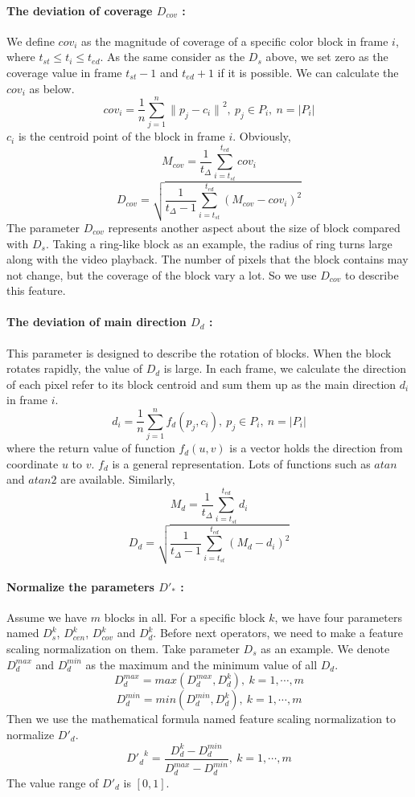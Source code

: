 \documentclass[a4paper, twocolumn]{article}
\begin{document}
			\paragraph{The deviation of coverage $D_{cov}$ :}
			We define $cov_i$ as the magnitude of coverage of a specific color block in frame $i$, where $t_{st} \leqslant t_i \leqslant t_{ed}$. As the same consider as the $D_s$ above, we set zero as the coverage value in frame $t_{st}-1$ and $t_{ed}+1$ if it is possible. We can calculate the $cov_i$ as below.
			$$cov_i = \frac{1}{n}\sum\limits_{j=1}^{n}{\lVert p_j-c_i \lVert}^2, \ p_j \in P_i, \ n=\lvert P_i \lvert$$
			$c_i$ is the centroid point of the block in frame $i$. Obviously,
			$$M_{cov} = \frac{1}{t_{\Delta}}\sum\limits_{i=t_{st}}^{t_{ed}}cov_i$$
			$$D_{cov} = \sqrt{\frac{1}{t_{\Delta}-1}\sum\limits_{i=t_{st}}^{t_{ed}}(M_{cov}-cov_i)^2}$$
			The parameter $D_{cov}$ represents another aspect about the size of block compared with $D_{s}$. Taking a ring-like block as an example, the radius of ring turns large along with the video playback. The number of pixels that the block contains may not change, but the coverage of the block vary a lot. So we use $D_{cov}$ to describe this feature.
			
			\paragraph{The deviation of main direction $D_d$ :}
			This parameter is designed to describe the rotation of blocks. When the block rotates rapidly, the value of $D_d$ is large. In each frame, we calculate the direction of each pixel refer to its block centroid and sum them up as the main direction $d_i$ in frame $i$.
			$$d_i = \frac{1}{n}\sum\limits_{j=1}^{n}{f_d(p_j,c_i)}, \ p_j \in P_i, \ n=\lvert P_i \lvert$$
			where the return value of function $f_d(u,v)$ is a vector holds the direction from coordinate $u$ to $v$. $f_d$ is a general representation. Lots of functions such as $atan$ and $atan2$ are available. Similarly,
			$$M_d = \frac{1}{t_{\Delta}}\sum\limits_{i=t_{st}}^{t_{ed}}d_i$$
			$$D_d = \sqrt{\frac{1}{t_{\Delta}-1}\sum\limits_{i=t_{st}}^{t_{ed}}(M_d-d_i)^2}$$
			
			\paragraph{Normalize the parameters ${D'}_*$ :}
			Assume we have $m$ blocks in all. For a specific block $k$, we have four parameters named $D_s^k$, $D_{cen}^k$, $D_{cov}^k$ and $D_d^k$. Before next operators, we need to make a feature scaling normalization on them. Take parameter $D_s$ as an example. We denote $D_d^{max}$ and $D_d^{min}$ as the maximum and the minimum value of all $D_d$.
			$$D_d^{max} = max(D_d^{max}, D_d^k), \ k = 1,\cdots,m$$
			$$D_d^{min} = min(D_d^{min}, D_d^k), \ k = 1,\cdots,m$$
			Then we use the mathematical formula named feature scaling normalization to normalize ${D'}_d$.
			$${{D'}_d}^k = \frac{D_d^k-D_d^{min}}{D_d^{max}-D_d^{min}}, \ k = 1,\cdots,m$$
			The value range of ${D'}_d$ is $[0,1]$.
			
\end{document}
